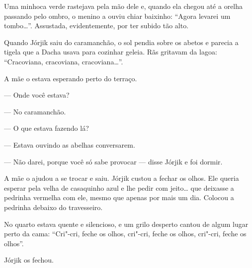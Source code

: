 Uma minhoca verde rastejava pela mão dele e, quando ela chegou até a
orelha passando pelo ombro, o menino a ouviu chiar baixinho: ``Agora levarei um
tombo\ldots{}''. Assustada, evidentemente, por ter subido tão alto.

Quando Jórjik saiu do caramanchão, o sol pendia sobre os abetos e
parecia a tigela que a Dacha usava para cozinhar geleia. Rãs gritavam da
lagoa: ``Cracoviana, cracoviana, cracoviana\ldots{}''.


A mãe o estava esperando perto do terraço.

--- Onde você estava?

--- No caramanchão.

--- O que estava fazendo lá?

--- Estava ouvindo as abelhas conversarem.



--- Não darei, porque você só sabe provocar --- disse Jórjik e foi
dormir.

A mãe o ajudou a se trocar e saiu. Jórjik custou a fechar os olhos. Ele
queria esperar pela velha de casaquinho azul e lhe pedir com jeito\ldots{}
que deixasse a pedrinha vermelha com ele, mesmo que apenas por mais um
dia. Colocou a pedrinha debaixo do travesseiro.

No quarto estava quente e silencioso, e um grilo desperto cantou de
algum lugar perto da cama: ``Cri"-cri, feche os olhos, cri"-cri, feche os
olhos, cri"-cri, feche os olhos''.

Jórjik os fechou.


